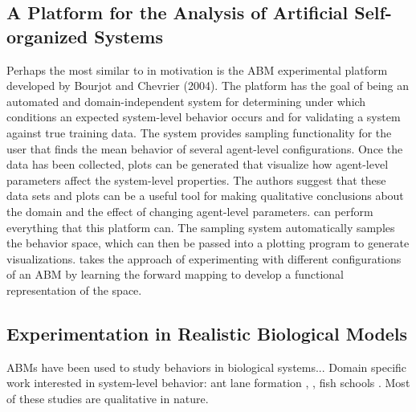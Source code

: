 \subsection{A Platform for the Analysis of Artificial Self-organized Systems}
Perhaps the most similar to \fw in motivation is the ABM experimental platform developed by Bourjot and Chevrier (2004)\nocite{bourjot2004platform}.
The platform has the goal of being an automated and domain-independent system for determining under which conditions an expected system-level behavior occurs and for validating a system against true training data.
The system provides sampling functionality for the user that finds the mean behavior of several agent-level configurations.
Once the data has been collected, plots can be generated that visualize how agent-level parameters affect the system-level properties.
The authors suggest that these data sets and plots can be a useful tool for making qualitative conclusions about the domain and the effect of changing agent-level parameters.
\fw can perform everything that this platform can.
The \fw sampling system automatically samples the behavior space, which can then be passed into a plotting program to generate visualizations.
\fw takes the approach of experimenting with different configurations of an ABM by learning the forward mapping to develop a functional representation of the space.

\subsection{Experimentation in Realistic Biological Models}
ABMs have been used to study behaviors in biological systems... Domain specific work interested in system-level behavior: ant lane formation , , fish schools . Most of these studies are qualitative in nature.


